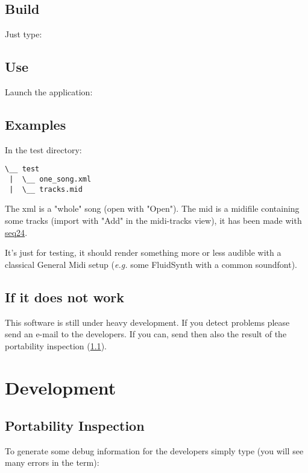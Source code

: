 \subsection{Build}

Just type:


\subsection{Use}

Launch the application:


\subsection{Examples}
In the test directory:

\begin{verbatim}
\__ test
 |  \__ one_song.xml
 |  \__ tracks.mid
\end{verbatim}

The xml is a "whole" song (open with "Open").  The mid is a midifile containing
some tracks (import with "Add" in the midi-tracks view), it has been made with
\href{http://www.filter24.org/seq24/}{seq24}.

It's just for testing, it should render something more or less audible with a
classical General Midi setup (\textit{e.g.} some FluidSynth with a common
soundfont).

\subsection{If it does not work}

This software is still under heavy development. If you detect problems please
send an e-mail to the developers. If you can, send then also the result of the
portability inspection (\ref{sec:inspect}).


\section{Development}

\subsection{Portability Inspection}
\label{sec:inspect}

To generate some debug information for the developers simply type (you will see
many errors in the term):

